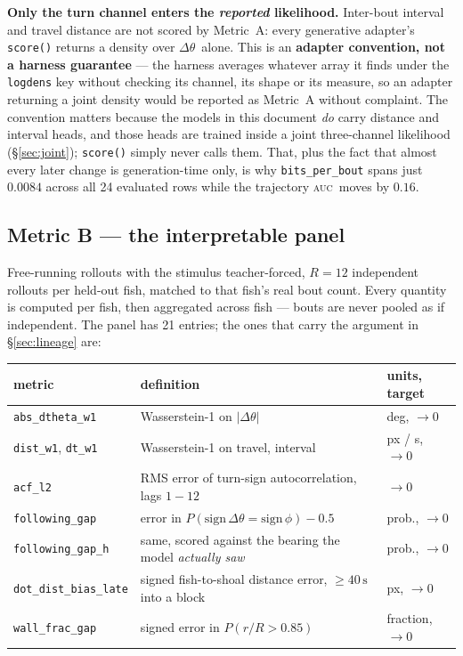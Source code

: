 \documentclass[11pt,a4paper]{article}
\newcommand{\uu}[1]{\ensuremath{\,\mathrm{#1}}}  %
\newcommand{\dth}{\ensuremath{\Delta\theta}}
\newcommand{\auc}{\textsc{auc}}
\newcommand{\code}[1]{\texttt{\small #1}}
\begin{document}
\begin{takeaway}
\textbf{Only the turn channel enters the \emph{reported} likelihood.} Inter-bout interval
and travel distance are not scored by Metric~A: every generative adapter's \code{score()}
returns a density over \dth\ alone. This is an \textbf{adapter convention, not a harness
guarantee} --- the harness averages whatever array it finds under the \code{logdens} key
without checking its channel, its shape or its measure, so an adapter returning a joint
density would be reported as Metric~A without complaint. The convention matters because
the models in this document \emph{do} carry distance and interval heads, and those heads
are trained inside a joint three-channel likelihood (\S\ref{sec:joint}); \code{score()}
simply never calls them. That, plus the fact that almost every later change is
generation-time only, is why \code{bits\_per\_bout} spans just $0.0084$ across all 24
evaluated rows while the trajectory \auc\ moves by $0.16$.
\end{takeaway}

\subsection{Metric B --- the interpretable panel}\label{sec:panel}

Free-running rollouts with the stimulus teacher-forced, $R=12$ independent rollouts per
held-out fish, matched to that fish's real bout count. Every quantity is computed per
fish, then aggregated across fish --- bouts are never pooled as if independent. The panel
has 21 entries; the ones that carry the argument in \S\ref{sec:lineage} are:

\begin{center}\small
\begin{tabular}{lll}
\toprule
\textbf{metric} & \textbf{definition} & \textbf{units, target} \\
\midrule
\code{abs\_dtheta\_w1} & Wasserstein-1 on $|\dth|$ & deg, $\to 0$ \\
\code{dist\_w1}, \code{dt\_w1} & Wasserstein-1 on travel, interval & px / s, $\to 0$ \\
\code{acf\_l2} & RMS error of turn-sign autocorrelation, lags $1\!-\!12$ & $\to 0$ \\
\code{following\_gap} & error in $P(\mathrm{sign}\,\dth{} = \mathrm{sign}\,\phi) - 0.5$ & prob., $\to 0$ \\
\code{following\_gap\_h} & same, scored against the bearing the model \emph{actually saw} & prob., $\to 0$ \\
\code{dot\_dist\_bias\_late} & signed fish-to-shoal distance error, $\geq40\uu{s}$ into a block & px, $\to 0$ \\
\code{wall\_frac\_gap} & signed error in $P(r/R > 0.85)$ & fraction, $\to 0$ \\
\bottomrule
\end{tabular}
\end{center}
\end{document}
